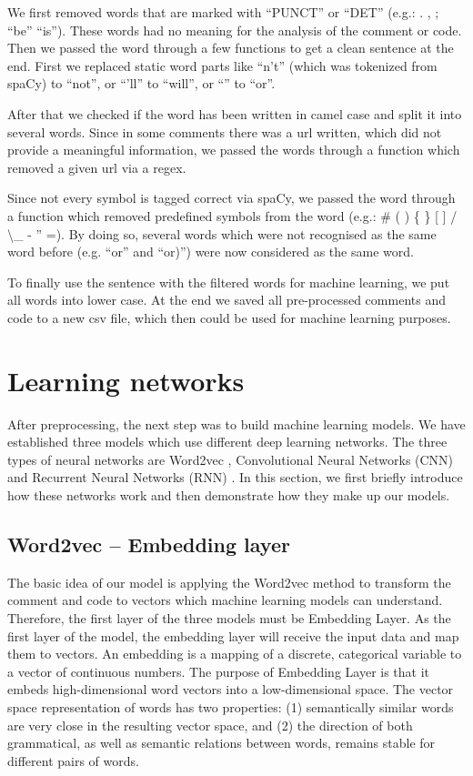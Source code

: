 \documentclass[runningheads]{llncs}
\begin{document}
We first removed words that are marked with ``PUNCT'' or ``DET'' (e.g.: . , ; ``be'' ``is''). These words had no meaning for the analysis of the comment or code.
Then we passed the word through a few functions to get a clean sentence at the end. First we replaced static word parts like ``n't'' (which was tokenized from spaCy) to ``not'', or ``'ll'' to ``will'', or ``\textbar\textbar'' to ``or''.

After that we checked if the word has been written in camel case and split it into several words. Since in some comments there was a url written, which did not provide a meaningful information, we passed the words through a function
which removed a given url via a regex.

Since not every symbol is tagged correct via spaCy, we passed the word through a function which removed predefined symbols from the word (e.g.: \# ( ) \{ \} [ ] / \textbackslash \_ - '' =).
By doing so, several words which were not recognised as the same word before (e.g. ``or'' and ``or)'') were now considered as the same word.

To finally use the sentence with the filtered words for machine learning, we put all words into lower case.
At the end we saved all pre-processed comments and code to a new csv file, which then could be used for machine learning purposes.


\section{Learning networks}\label{chapter:learning}
After preprocessing, the next step was to build machine learning models. We have established three models which use different deep learning networks. The three types of neural networks are Word2vec \cite{ref_mikolov}, Convolutional Neural Networks (CNN) \cite{ref_yoon} and Recurrent Neural Networks (RNN) \cite{ref_rnn}. In this section, we first briefly introduce how these networks work and then demonstrate how they make up our models.

\subsection{Word2vec -- Embedding layer}
The basic idea of our model is applying the Word2vec method to transform the comment and code to vectors which machine learning models can understand. Therefore, the first layer of the three models must be Embedding Layer. As the first layer of the model, the embedding layer will receive the input data and map them to vectors. An embedding is a mapping of a discrete, categorical variable to a vector of continuous numbers. The purpose of Embedding Layer is that it embeds high-dimensional word vectors into a low-dimensional space. The vector space representation of words has two properties: (1) semantically similar words are very close in the resulting vector space, and (2) the direction of both grammatical, as well as semantic relations between words, remains stable for different pairs of words. 
\end{document}
